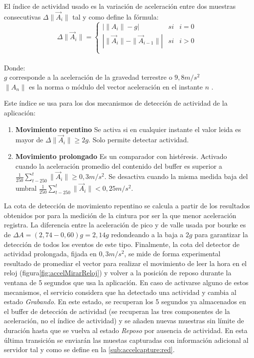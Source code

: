 El índice de actividad usado es la variación de aceleración entre dos muestras consecutivas $\Delta \|\vec{A}_i\|$ tal y como define la fórmula:
\[
  \Delta \|\vec{A}_{i}\|=\left\{
    \begin{array}{lcl}
      |\|A_i\| - g|       & si & i = 0 \\
      |\|\vec{A}_i\| - \|\vec{A}_{i-1}\|| & si & i > 0 \\
    \end{array}
    \right.
\]\\

Donde:\\
$g$ corresponde a la aceleración de la gravedad terrestre o $9,8m/s^2$\\
$\|A_n\|$ es la norma o módulo del vector aceleración en el instante $n$ . 

Este índice se usa para los dos mecanismos de detección de actividad de la aplicación:

\begin{enumerate}
  \item \textbf{Movimiento repentino} Se activa si en cualquier instante el valor leida es mayor de $\Delta \|\vec{A}_i\|\geq2g$. Solo permite detectar actividad.
  \item \textbf{Movimiento prolongado} Es un comparador con histéresis. Activado cuando la aceleración promedio del contenido del buffer es superior a $\frac{1}{250}\sum_{t-250}^t\|\vec{A}_i\|\geq0,3m/s^2$. Se desactiva cuando la misma medida baja del umbral $\frac{1}{250}\sum_{t-250}^t\|\vec{A}_i\|<0,25m/s^2$.
\end{enumerate}

La cota de detección de movimiento repentino se calcula a partir de los resultados obtenidos por  para la medición de la cintura por ser la que menor aceleración registra. La diferencia entre la aceleración de pico y de valle usada por bourke es de $\Delta A = (2,74 - 0,60)g = 2,14g$ redondeando a la baja a $2g$ para garantizar la detección de todos los eventos de este tipo. Finalmente, la cota del detector de actividad prolongada, fijada en $0,3m/s^2$, se mide de forma experimental resultado de promediar el vector para realizar el movimiento de leer la hora en el reloj (figura\ref{fig:accelMirarReloj}) y volver a la posición de reposo durante la ventana de 5 segundos que usa la aplicación. En caso de activarse alguno de estos mecanismos, el servicio considera que ha detectado una actividad y cambia al estado \textit{Grabando}. En este estado, se recuperan los 5 segundos ya almacenados en el buffer de detección de actividad (se recuperan las tres componentes de la aceleración, no el índice de actividad) y se añaden nuevas muestras sin límite de duración hasta que se vuelva al estado \textit{Reposo} por ausencia de actividad. En esta última transición se enviarán las muestas capturadas con información adicional al servidor tal y como se define en la \autoref{sub:accelcapture:red}.


